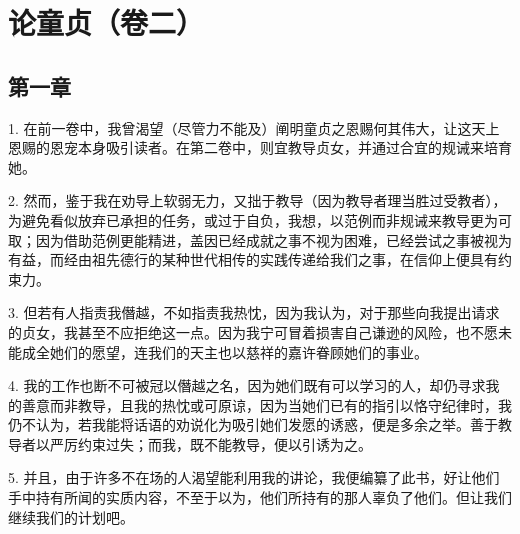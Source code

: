 

\section{论童贞（卷二）}


\subsection{第一章}

\par

1. 在前一卷中，我曾渴望（尽管力不能及）阐明童贞之恩赐何其伟大，让这天上恩赐的恩宠本身吸引读者。在第二卷中，则宜教导贞女，并通过合宜的规诫来培育她。\par

2. 然而，鉴于我在劝导上软弱无力，又拙于教导（因为教导者理当胜过受教者），为避免看似放弃已承担的任务，或过于自负，我想，以范例而非规诫来教导更为可取；因为借助范例更能精进，盖因已经成就之事不视为困难，已经尝试之事被视为有益，而经由祖先德行的某种世代相传的实践传递给我们之事，在信仰上便具有约束力。\par

3. 但若有人指责我僭越，不如指责我热忱，因为我认为，对于那些向我提出请求的贞女，我甚至不应拒绝这一点。因为我宁可冒着损害自己谦逊的风险，也不愿未能成全她们的愿望，连我们的天主也以慈祥的嘉许眷顾她们的事业。\par

4. 我的工作也断不可被冠以僭越之名，因为她们既有可以学习的人，却仍寻求我的善意而非教导，且我的热忱或可原谅，因为当她们已有的指引以恪守纪律时，我仍不认为，若我能将话语的劝说化为吸引她们发愿的诱惑，便是多余之举。善于教导者以严厉约束过失；而我，既不能教导，便以引诱为之。\par

5. 并且，由于许多不在场的人渴望能利用我的讲论，我便编纂了此书，好让他们手中持有所闻的实质内容，不至于以为，他们所持有的那人辜负了他们。但让我们继续我们的计划吧。\par

